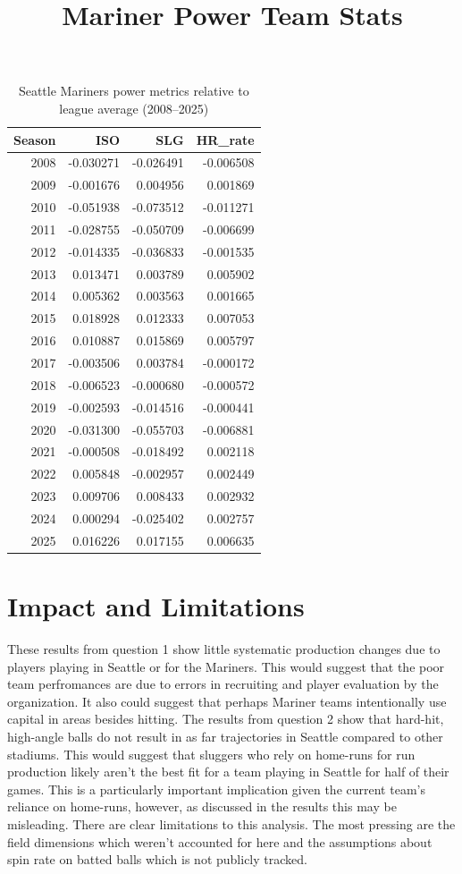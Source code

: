 \documentclass[11pt,twocolumn]{article}
\begin{document}
\begin{table}[t]
\centering
\title{Mariner Power Team Stats}
\begin{tabular}{rrrr}
\hline
Season & ISO & SLG & HR\_rate \\
\hline
2008 & -0.030271 & -0.026491 & -0.006508 \\
2009 & -0.001676 &  0.004956 &  0.001869 \\
2010 & -0.051938 & -0.073512 & -0.011271 \\
2011 & -0.028755 & -0.050709 & -0.006699 \\
2012 & -0.014335 & -0.036833 & -0.001535 \\
2013 &  0.013471 &  0.003789 &  0.005902 \\
2014 &  0.005362 &  0.003563 &  0.001665 \\
2015 &  0.018928 &  0.012333 &  0.007053 \\
2016 &  0.010887 &  0.015869 &  0.005797 \\
2017 & -0.003506 &  0.003784 & -0.000172 \\
2018 & -0.006523 & -0.000680 & -0.000572 \\
2019 & -0.002593 & -0.014516 & -0.000441 \\
2020 & -0.031300 & -0.055703 & -0.006881 \\
2021 & -0.000508 & -0.018492 &  0.002118 \\
2022 &  0.005848 & -0.002957 &  0.002449 \\
2023 &  0.009706 &  0.008433 &  0.002932 \\
2024 &  0.000294 & -0.025402 &  0.002757 \\
2025 &  0.016226 &  0.017155 &  0.006635 \\
\hline
\end{tabular}
\caption{Seattle Mariners power metrics relative to league average (2008--2025)}
\label{tab:mariners_power}
\end{table}

\section{Impact and Limitations}

These results from question 1 show little systematic production changes due to players playing in Seattle or for the Mariners. This would suggest that the poor team perfromances are due to errors in recruiting and player evaluation by the organization. It also could suggest that perhaps Mariner teams intentionally use capital in areas besides hitting. The results from question 2 show that hard-hit, high-angle balls do not result in as far trajectories in Seattle compared to other stadiums. This would suggest that sluggers who rely on home-runs for run production likely aren't the best fit for a team playing in Seattle for half of their games. This is a particularly important implication given the current team's reliance on home-runs, however, as discussed in the results this may be misleading. There are clear limitations to this analysis. The most pressing are the field dimensions which weren't accounted for here and the assumptions about spin rate on batted balls which is not publicly tracked.
\end{document}

